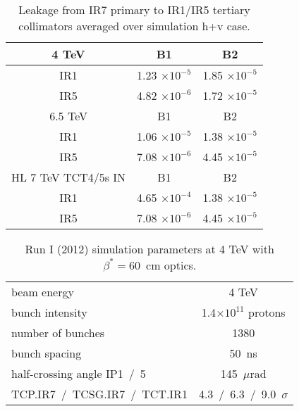 \begin{table}%
   \centering
   \caption{Leakage from IR7 primary to IR1/IR5 tertiary collimators averaged over simulation h+v case.}

   \begin{tabular}{c|c|c}
       \hline
       4 TeV  & B1 & B2\\
       \hline
       IR1 & 1.23 $\times 10^{-5}$ & 1.85 $\times 10^{-5}$  \\
       IR5 & 4.82 $\times 10^{-6}$ & 1.72 $\times 10^{-5}$  \\
       \hline       \hline
       6.5 TeV  & B1 & B2\\
       \hline
       IR1 & 1.06 $\times 10^{-5}$ & 1.38 $\times 10^{-5}$  \\
       IR5 & 7.08 $\times 10^{-6}$ & 4.45 $\times 10^{-5}$  \\
       \hline       \hline
       HL 7 TeV TCT4/5s IN  & B1 & B2\\
       \hline
       IR1 & 4.65 $\times 10^{-4}$ & 1.38 $\times 10^{-5}$  \\
       IR5 & 7.08 $\times 10^{-6}$ & 4.45 $\times 10^{-5}$  \\

       \hline
   \end{tabular}
   \label{leakageFactors4TeV}
\end{table}


\begin{table}
   \centering
   \caption{Run I (2012) simulation parameters at 4 TeV with $\beta^* = 60$~cm optics.}
   \begin{tabular}{l|c}
       \hline
       beam energy & 4 TeV \\
       bunch intensity & 1.4$\times 10^{11}$ protons\\
       number of bunches & 1380 \\
       bunch spacing & 50~ns \\
       half-crossing angle IP1~/~5 & 145~$\mu$rad \\
       TCP.IR7~/~TCSG.IR7~/~TCT.IR1 & 4.3~/~6.3~/~9.0~$\sigma$ \\
       \hline
   \end{tabular}
   \label{paramsRun1}
\end{table}

